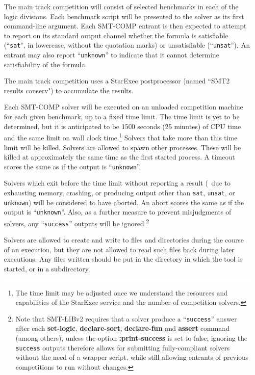\documentclass[12pt]{article}
\newcommand{\akey}[1]{\textbf{#1}}
\begin{document}
The main track competition will consist of selected benchmarks in each of the
logic divisions.
Each benchmark script will be presented to the solver as its first command-line argument.
Each SMT-COMP entrant is then expected to attempt to report on its
standard output channel whether the formula is satisfiable
(``\texttt{sat}'', in lowercase, without the quotation marks) or unsatisfiable
(``\texttt{unsat}'').  An entrant may also report ``\texttt{unknown}''
to indicate that it cannot determine satisfiability of the formula.

The main track competition uses a StarExec postprocessor (named ``SMT2 results conserv") to accumulate the results.

Each SMT-COMP solver will be executed on an
unloaded competition machine for each given benchmark, up to a fixed
time limit.  The time limit is yet to be determined, but it is
anticipated to be 1500 seconds (25 minutes) of CPU time and the same limit on wall clock time.\footnote{The time limit may be adjusted once we understand the resources and capabilities of the StarExec service and the number of competition solvers.} 
Solvers that take more than this
time limit will be killed.  Solvers are allowed to spawn other
processes.  These will be killed at approximately the same time as the
first started process.  A
timeout scores the same as if the output is ``\texttt{unknown}''.


Solvers which exit before the time
limit without reporting a result (\ie\ due to exhausting memory, crashing,
or producing output other than \texttt{sat}, \texttt{unsat}, or
\texttt{unknown})
will be considered to have aborted. 
An abort scores the same as if the output is ``\texttt{unknown}''. 
Also, as a further measure to prevent misjudgments of solvers,
any  ``\texttt{success}'' outputs will be 
ignored.\footnote{
Note that SMT-LIBv2 requires that a solver produce a ``\texttt{success}'' answer
after each \akey{set-logic}, \akey{declare-sort}, \akey{declare-fun} and
\akey{assert} command (among others), unless the option
\akey{:print-success} is set to false; ignoring the
\texttt{success} outputs therefore allows for submitting fully-compliant
solvers without the need of a wrapper script, while still allowing entrants
of previous competitions to run without changes.}

Solvers are allowed to create and write to
files and directories during the course of an execution, but they are
not allowed to read such files back during later executions.  Any
files written should be put in the directory in which the tool is
started, or in a subdirectory.
\end{document}
